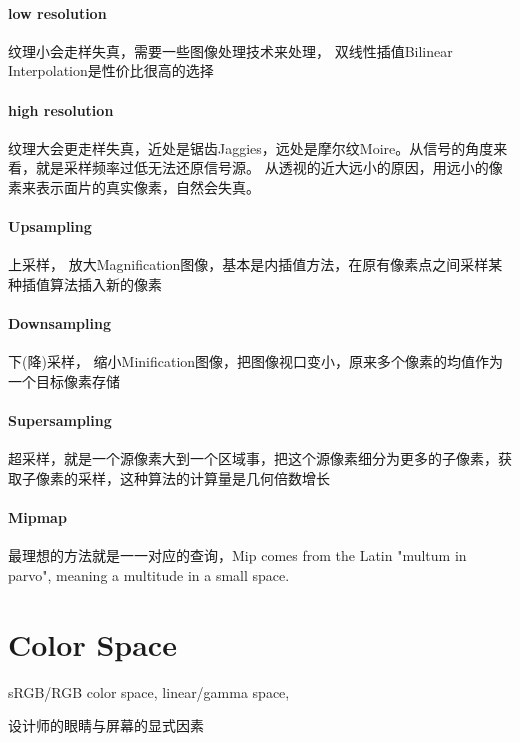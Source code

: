 \paragraph{low resolution}
纹理小会走样失真，需要一些图像处理技术来处理，
双线性插值Bilinear Interpolation是性价比很高的选择

\paragraph{high resolution}
纹理大会更走样失真，近处是锯齿Jaggies，远处是摩尔纹Moire。从信号的角度来看，就是采样频率过低无法还原信号源。
从透视的近大远小的原因，用远小的像素来表示面片的真实像素，自然会失真。

\paragraph{Upsampling}
上采样，
放大Magnification图像，基本是内插值方法，在原有像素点之间采样某种插值算法插入新的像素

\paragraph{Downsampling}
下(降)采样，
缩小Minification图像，把图像视口变小，原来多个像素的均值作为一个目标像素存储

\paragraph{Supersampling}
超采样，就是一个源像素大到一个区域事，把这个源像素细分为更多的子像素，获取子像素的采样，这种算法的计算量是几何倍数增长

\paragraph{Mipmap}
最理想的方法就是一一对应的查询，Mip comes from the Latin "multum in parvo", meaning a multitude in a small space.


\section{Color Space}
sRGB/RGB color space, linear/gamma space, 

设计师的眼睛与屏幕的显式因素

